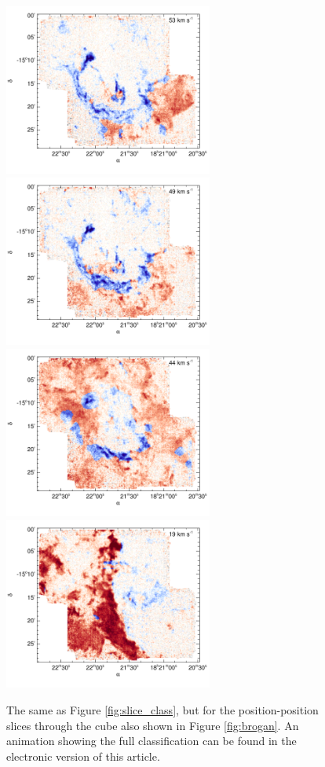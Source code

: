\begin{figure}
\includegraphics[width=2.7in]{pp_slice_0}\hfill
\includegraphics[width=2.7in]{pp_slice_1}
\includegraphics[width=2.7in]{pp_slice_2}\hfill
\includegraphics[width=2.7in]{pp_slice_3}

\caption{The same as Figure \ref{fig:slice_class}, but for the position-position slices through the cube also shown in Figure \ref{fig:brogan}. An animation showing the full classification can be found in the electronic version of this article.}
\label{fig:pp_slice}
\end{figure}

